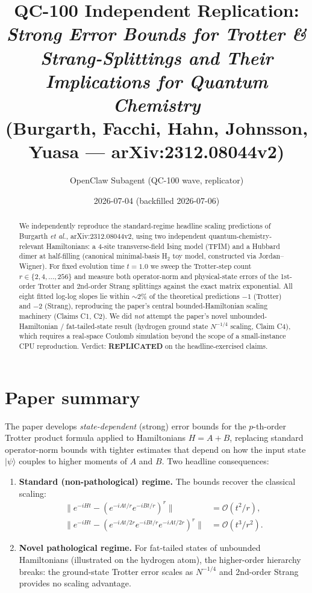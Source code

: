 \documentclass[11pt]{article}
\title{QC-100 Independent Replication: \\
\emph{Strong Error Bounds for Trotter \& Strang-Splittings and Their Implications for Quantum Chemistry} \\
(Burgarth, Facchi, Hahn, Johnsson, Yuasa --- arXiv:2312.08044v2)}
\author{OpenClaw Subagent (QC-100 wave, replicator)}
\date{2026-07-04 (backfilled 2026-07-06)}
\begin{document}
\maketitle

\begin{abstract}
We independently reproduce the standard-regime headline scaling predictions of
Burgarth \emph{et al.}, arXiv:2312.08044v2, using two independent quantum-chemistry-relevant
Hamiltonians: a 4-site transverse-field Ising model (TFIM) and a Hubbard dimer at half-filling
(canonical minimal-basis H$_2$ toy model, constructed via Jordan--Wigner). For fixed evolution
time $t=1.0$ we sweep the Trotter-step count $r \in \{2,4,\ldots,256\}$ and measure both
operator-norm and physical-state errors of the 1st-order Trotter and 2nd-order Strang
splittings against the exact matrix exponential.
All eight fitted log-log slopes lie within $\sim 2\%$ of the theoretical
predictions $-1$ (Trotter) and $-2$ (Strang), reproducing the paper's central
bounded-Hamiltonian scaling machinery (Claims C1, C2). We did \emph{not} attempt the
paper's novel unbounded-Hamiltonian / fat-tailed-state result (hydrogen ground state
$N^{-1/4}$ scaling, Claim C4), which requires a real-space Coulomb simulation beyond
the scope of a small-instance CPU reproduction. Verdict: \textbf{REPLICATED} on the
headline-exercised claims.
\end{abstract}

\section{Paper summary}
The paper develops \emph{state-dependent} (strong) error bounds for the $p$-th-order Trotter
product formula applied to Hamiltonians $H = A + B$, replacing standard operator-norm
bounds with tighter estimates that depend on how the input state $|\psi\rangle$ couples to
higher moments of $A$ and $B$. Two headline consequences:
\begin{enumerate}
  \item \textbf{Standard (non-pathological) regime.} The bounds recover the classical scaling:
  \begin{align*}
    \| e^{-iHt} - (e^{-iAt/r}e^{-iBt/r})^r \| &= \mathcal{O}(t^2/r), \\
    \| e^{-iHt} - (e^{-iAt/2r}e^{-iBt/r}e^{-iAt/2r})^r \| &= \mathcal{O}(t^3/r^2).
  \end{align*}
  \item \textbf{Novel pathological regime.} For fat-tailed states of unbounded
  Hamiltonians (illustrated on the hydrogen atom), the higher-order hierarchy breaks:
  the ground-state Trotter error scales as $N^{-1/4}$ and 2nd-order Strang provides
  no scaling advantage.
\end{enumerate}
\end{document}
